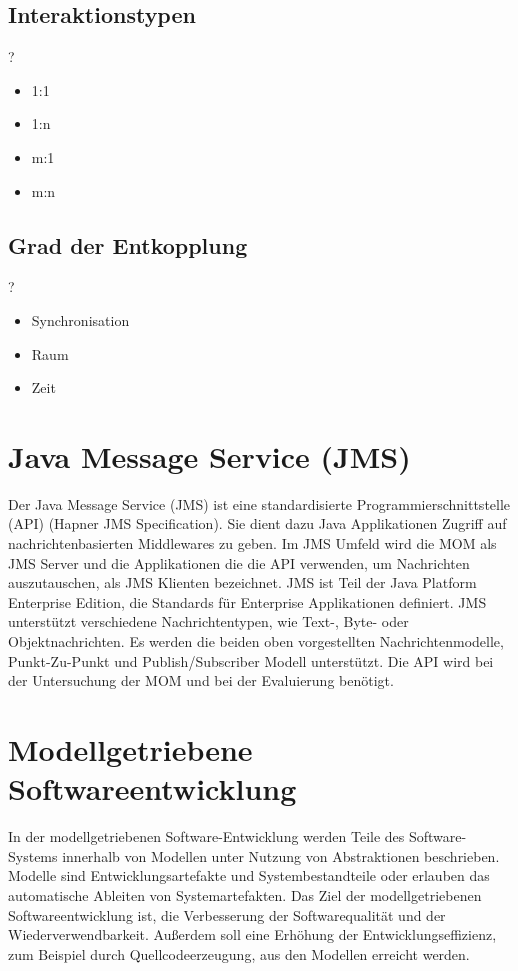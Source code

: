 \subsection{Interaktionstypen}
?
\begin{itemize}
    \item 1:1
    \item 1:n
    \item m:1
    \item m:n
\end{itemize}
\subsection{Grad der Entkopplung}
?
\begin{itemize}
    \item Synchronisation
    \item Raum
    \item Zeit
\end{itemize}
\section{Java Message Service (JMS)}
Der Java Message Service (JMS) ist eine standardisierte Programmierschnittstelle (API) (Hapner JMS Specification). Sie dient dazu Java Applikationen Zugriff auf nachrichtenbasierten Middlewares zu geben. Im JMS Umfeld wird die MOM als JMS Server und die Applikationen die die API verwenden, um Nachrichten auszutauschen, als JMS Klienten bezeichnet. JMS ist Teil der Java Platform Enterprise Edition, die Standards für Enterprise Applikationen definiert. JMS unterstützt verschiedene Nachrichtentypen, wie Text-, Byte- oder Objektnachrichten. Es werden die beiden oben vorgestellten Nachrichtenmodelle, Punkt-Zu-Punkt und Publish/Subscriber Modell unterstützt.
Die API wird bei der Untersuchung der MOM und bei der Evaluierung benötigt.

\section{Modellgetriebene Softwareentwicklung}
In der modellgetriebenen Software-Entwicklung \cite{MDSD} werden Teile des Software-Systems innerhalb von Modellen unter Nutzung von Abstraktionen beschrieben. Modelle sind Entwicklungsartefakte und Systembestandteile oder erlauben das automatische Ableiten von Systemartefakten. Das Ziel der modellgetriebenen Softwareentwicklung ist, die Verbesserung der Softwarequalität und der Wiederverwendbarkeit. Außerdem soll eine Erhöhung der Entwicklungseffizienz, zum Beispiel durch Quellcodeerzeugung, aus den Modellen erreicht werden.

